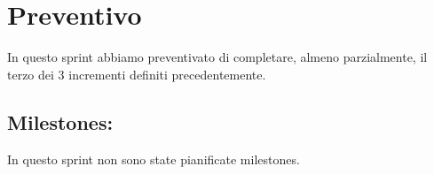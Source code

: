 \section{Preventivo}

In questo sprint abbiamo preventivato di completare, almeno parzialmente, il terzo dei 3 incrementi definiti precedentemente.

\subsection{Milestones:}  

In questo sprint non sono state pianificate milestones.